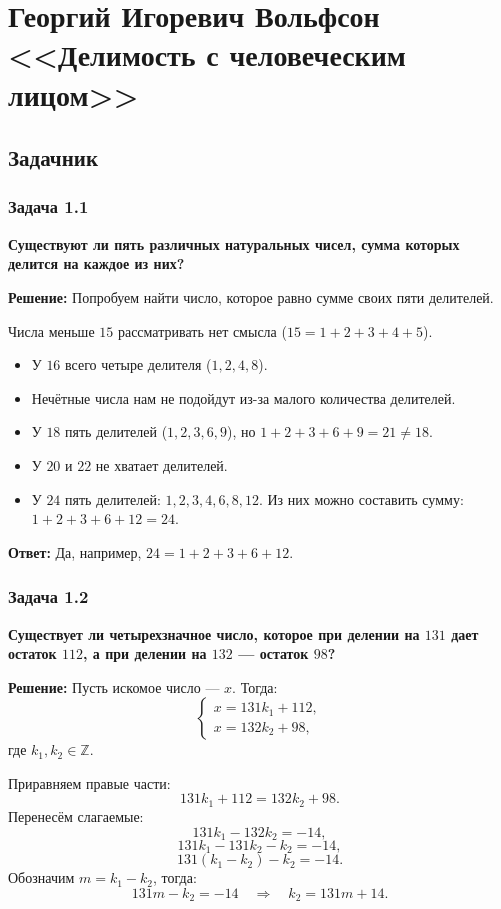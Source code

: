 \documentclass[12pt, a4paper]{article}
\begin{document}
\section*{Георгий Игоревич Вольфсон <<Делимость с человеческим лицом>>}

\subsection*{Задачник}

\subsubsection*{Задача 1.1}
\textbf{Существуют ли пять различных натуральных чисел, сумма которых делится на каждое из них?}

\textbf{Решение:}
Попробуем найти число, которое равно сумме своих пяти делителей. 

Числа меньше $15$ рассматривать нет смысла ($15 = 1 + 2 + 3 + 4 + 5$). 
\begin{itemize}
    \item У $16$ всего четыре делителя ($1, 2, 4, 8$).
    \item Нечётные числа нам не подойдут из-за малого количества делителей.
    \item У $18$ пять делителей ($1, 2, 3, 6, 9$), но $1 + 2 + 3 + 6 + 9 = 21 \neq 18$.
    \item У $20$ и $22$ не хватает делителей.
    \item У $24$ пять делителей: $1, 2, 3, 4, 6, 8, 12$. Из них можно составить сумму: $1 + 2 + 3 + 6 + 12 = 24$.
\end{itemize}

\textbf{Ответ:} Да, например, $24 = 1 + 2 + 3 + 6 + 12$.

\subsubsection*{Задача 1.2}
\textbf{Существует ли четырехзначное число, которое при делении на $131$ дает остаток $112$, а при делении на $132$ — остаток $98$?}

\textbf{Решение:}
Пусть искомое число — $x$. Тогда:
\[
\begin{cases}
x = 131k_1 + 112, \\
x = 132k_2 + 98,
\end{cases}
\]
где $k_1, k_2 \in \mathbb{Z}$.

Приравняем правые части:
\[
131k_1 + 112 = 132k_2 + 98.
\]
Перенесём слагаемые:
\[
131k_1 - 132k_2 = -14,
\]
\[
131k_1 - 131k_2 - k_2 = -14,
\]
\[
131(k_1 - k_2) - k_2 = -14.
\]
Обозначим $m = k_1 - k_2$, тогда:
\[
131m - k_2 = -14 \quad \Rightarrow \quad k_2 = 131m + 14.
\]
\end{document}
